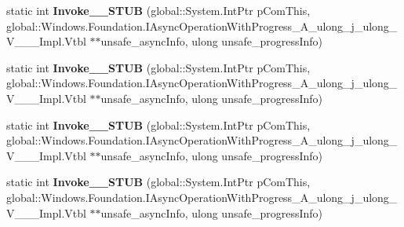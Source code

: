 \begin{DoxyCompactItemize}
\item 
\mbox{\label{struct_windows_1_1_foundation_1_1_async_operation_progress_handler___a__ulong__j__ulong___v_______impl_1_1_vtbl_a7b029958fa48e989f523d85c1627a34e}} 
static int {\bfseries Invoke\+\_\+\+\_\+\+S\+T\+UB} (global\+::\+System.\+Int\+Ptr p\+Com\+This, global\+::\+Windows.\+Foundation.\+I\+Async\+Operation\+With\+Progress\+\_\+\+A\+\_\+ulong\+\_\+j\+\_\+ulong\+\_\+\+V\+\_\+\+\_\+\+\_\+\+Impl.\+Vtbl $\ast$$\ast$unsafe\+\_\+async\+Info, ulong unsafe\+\_\+progress\+Info)
\item 
\mbox{\label{struct_windows_1_1_foundation_1_1_async_operation_progress_handler___a__ulong__j__ulong___v_______impl_1_1_vtbl_a7b029958fa48e989f523d85c1627a34e}} 
static int {\bfseries Invoke\+\_\+\+\_\+\+S\+T\+UB} (global\+::\+System.\+Int\+Ptr p\+Com\+This, global\+::\+Windows.\+Foundation.\+I\+Async\+Operation\+With\+Progress\+\_\+\+A\+\_\+ulong\+\_\+j\+\_\+ulong\+\_\+\+V\+\_\+\+\_\+\+\_\+\+Impl.\+Vtbl $\ast$$\ast$unsafe\+\_\+async\+Info, ulong unsafe\+\_\+progress\+Info)
\item 
\mbox{\label{struct_windows_1_1_foundation_1_1_async_operation_progress_handler___a__ulong__j__ulong___v_______impl_1_1_vtbl_a7b029958fa48e989f523d85c1627a34e}} 
static int {\bfseries Invoke\+\_\+\+\_\+\+S\+T\+UB} (global\+::\+System.\+Int\+Ptr p\+Com\+This, global\+::\+Windows.\+Foundation.\+I\+Async\+Operation\+With\+Progress\+\_\+\+A\+\_\+ulong\+\_\+j\+\_\+ulong\+\_\+\+V\+\_\+\+\_\+\+\_\+\+Impl.\+Vtbl $\ast$$\ast$unsafe\+\_\+async\+Info, ulong unsafe\+\_\+progress\+Info)
\item 
\mbox{\label{struct_windows_1_1_foundation_1_1_async_operation_progress_handler___a__ulong__j__ulong___v_______impl_1_1_vtbl_a7b029958fa48e989f523d85c1627a34e}} 
static int {\bfseries Invoke\+\_\+\+\_\+\+S\+T\+UB} (global\+::\+System.\+Int\+Ptr p\+Com\+This, global\+::\+Windows.\+Foundation.\+I\+Async\+Operation\+With\+Progress\+\_\+\+A\+\_\+ulong\+\_\+j\+\_\+ulong\+\_\+\+V\+\_\+\+\_\+\+\_\+\+Impl.\+Vtbl $\ast$$\ast$unsafe\+\_\+async\+Info, ulong unsafe\+\_\+progress\+Info)

\end{DoxyCompactItemize}
